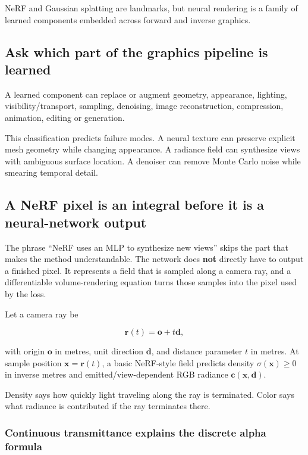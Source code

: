 NeRF and Gaussian splatting are landmarks, but neural rendering is a family of learned components embedded across forward and inverse graphics.

\subsection{Ask which part of the graphics pipeline is learned}\label{ask-which-part-of-the-graphics-pipeline-is-learned}

A learned component can replace or augment geometry, appearance, lighting, visibility/transport, sampling, denoising, image reconstruction, compression, animation, editing or generation.

This classification predicts failure modes. A neural texture can preserve explicit mesh geometry while changing appearance. A radiance field can synthesize views with ambiguous surface location. A denoiser can remove Monte Carlo noise while smearing temporal detail.

\subsection{A NeRF pixel is an integral before it is a neural-network output}\label{a-nerf-pixel-is-an-integral-before-it-is-a-neural-network-output}

The phrase ``NeRF uses an MLP to synthesize new views'' skips the part that makes the method understandable. The network does \textbf{not} directly have to output a finished pixel. It represents a field that is sampled along a camera ray, and a differentiable volume-rendering equation turns those samples into the pixel used by the loss.

Let a camera ray be

\[\mathbf r(t)=\mathbf o+t\mathbf d,\]

with origin \(\mathbf o\) in metres, unit direction \(\mathbf d\), and distance parameter \(t\) in metres. At sample position \(\mathbf x=\mathbf r(t)\), a basic NeRF-style field predicts density \(\sigma(\mathbf x)\ge0\) in inverse metres and emitted/view-dependent RGB radiance \(\mathbf c(\mathbf x,\mathbf d)\).

Density says how quickly light traveling along the ray is terminated. Color says what radiance is contributed if the ray terminates there.

\subsubsection{Continuous transmittance explains the discrete alpha formula}\label{continuous-transmittance-explains-the-discrete-alpha-formula}

